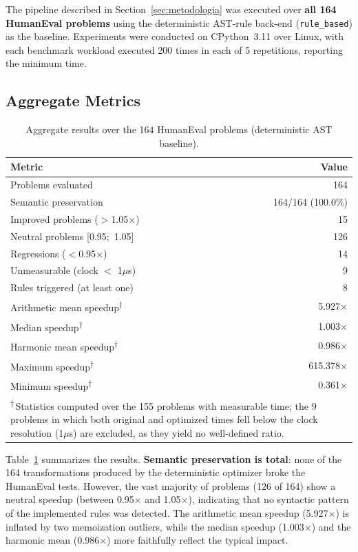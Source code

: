 \documentclass[conference]{IEEEtran}
\begin{document}
The pipeline described in Section~\ref{sec:metodologia} was executed over \textbf{all 164 HumanEval problems} using the deterministic AST-rule back-end (\texttt{rule\_based}) as the baseline. Experiments were conducted on CPython~3.11 over Linux, with each benchmark workload executed 200 times in each of 5 repetitions, reporting the minimum time.

\subsection{Aggregate Metrics}

\begin{table}[htbp]
\caption{Aggregate results over the 164 HumanEval problems (deterministic AST baseline).}
\label{tab:agregado}
\centering
\begin{tabular}{lr}
\hline
\textbf{Metric} & \textbf{Value} \\
\hline
Problems evaluated & 164 \\
Semantic preservation & 164/164 (100.0\%) \\
Improved problems ($>$1.05$\times$) & 15 \\
Neutral problems [0.95;~1.05] & 126 \\
Regressions ($<$0.95$\times$) & 14 \\
Unmeasurable (clock $<$ 1$\mu$s) & 9 \\
Rules triggered (at least one) & 8 \\
\hline
Arithmetic mean speedup\textsuperscript{$\dagger$} & 5.927$\times$ \\
Median speedup\textsuperscript{$\dagger$} & 1.003$\times$ \\
Harmonic mean speedup\textsuperscript{$\dagger$} & 0.986$\times$ \\
Maximum speedup\textsuperscript{$\dagger$} & 615.378$\times$ \\
Minimum speedup\textsuperscript{$\dagger$} & 0.361$\times$ \\
\hline
\multicolumn{2}{p{0.92\columnwidth}}{\scriptsize \textsuperscript{$\dagger$}\,Statistics computed over the 155 problems with measurable time; the 9 problems in which both original and optimized times fell below the clock resolution (1$\mu$s) are excluded, as they yield no well-defined ratio.} \\
\end{tabular}
\end{table}

Table~\ref{tab:agregado} summarizes the results. \textbf{Semantic preservation is total}: none of the 164 transformations produced by the deterministic optimizer broke the HumanEval tests. However, the vast majority of problems (126 of 164) show a neutral speedup (between 0.95$\times$ and 1.05$\times$), indicating that no syntactic pattern of the implemented rules was detected. The arithmetic mean speedup (5.927$\times$) is inflated by two memoization outliers, while the median speedup (1.003$\times$) and the harmonic mean (0.986$\times$) more faithfully reflect the typical impact.
\end{document}
